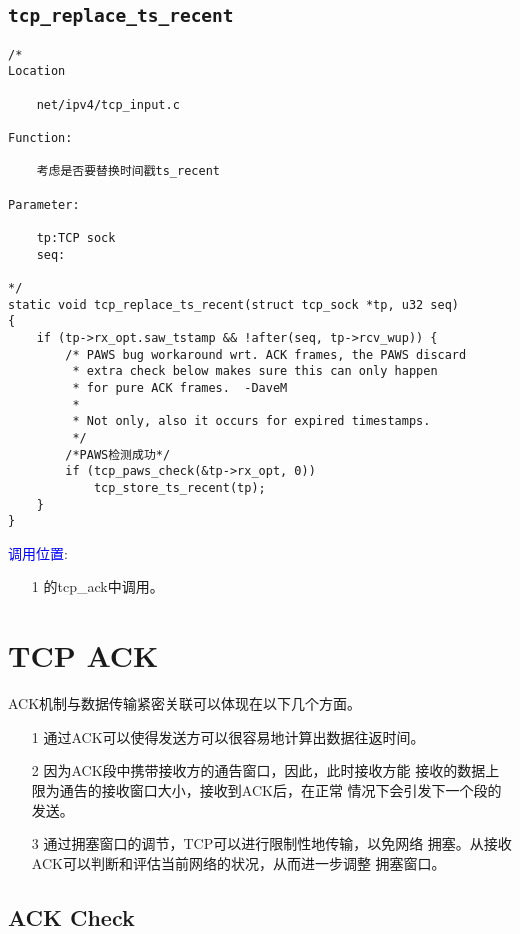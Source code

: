     \subsection{\texttt{tcp_replace_ts_recent}}
        \label{TCPTimestamp:tcp_replace_ts_recent}
\begin{verbatim}
/*
Location

    net/ipv4/tcp_input.c

Function:

    考虑是否要替换时间戳ts_recent

Parameter:

    tp:TCP sock
    seq:

*/
static void tcp_replace_ts_recent(struct tcp_sock *tp, u32 seq)
{
    if (tp->rx_opt.saw_tstamp && !after(seq, tp->rcv_wup)) {
        /* PAWS bug workaround wrt. ACK frames, the PAWS discard
         * extra check below makes sure this can only happen
         * for pure ACK frames.  -DaveM
         *
         * Not only, also it occurs for expired timestamps.
         */
        /*PAWS检测成功*/
        if (tcp_paws_check(&tp->rx_opt, 0))
            tcp_store_ts_recent(tp);
    }
}
\end{verbatim}

        \textcolor{blue}{调用位置}:
            \begin{enumerate}
                \item[1]        \label{ClientReceiveSYN+ACK:tcp_ack}的tcp\_ack中调用。
            \end{enumerate}

\section{TCP ACK}
    ACK机制与数据传输紧密关联可以体现在以下几个方面。
\begin{enumerate}
\item[1]    通过ACK可以使得发送方可以很容易地计算出数据往返时间。
\item[2]    因为ACK段中携带接收方的通告窗口，因此，此时接收方能
            接收的数据上限为通告的接收窗口大小，接收到ACK后，在正常
            情况下会引发下一个段的发送。
\item[3]    通过拥塞窗口的调节，TCP可以进行限制性地传输，以免网络
            拥塞。从接收ACK可以判断和评估当前网络的状况，从而进一步调整
            拥塞窗口。
\end{enumerate}

    \subsection{ACK Check}
